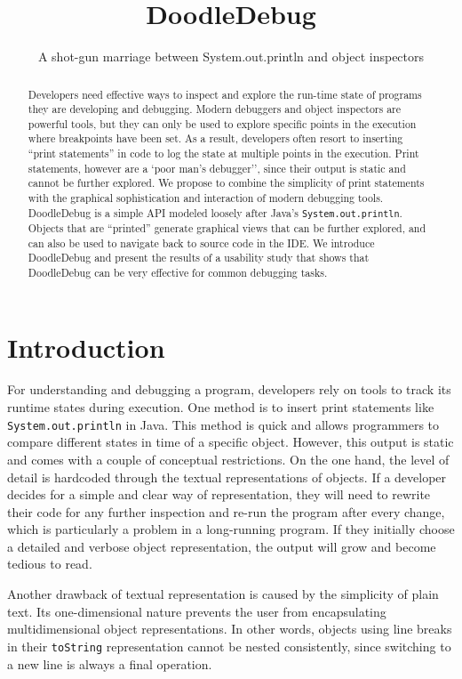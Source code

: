 \documentclass[english]{scrartcl}
\newcommand{\DD}{Dood\-le\-De\-bug\xspace}
\newcommand{\println}{\texttt{Sys\-tem.\-out.\-println}\xspace}
\begin{document}
\title{DoodleDebug}
\subtitle{A shot-gun marriage between System.out.println and object inspectors}
\maketitle

\begin{abstract}
Developers need effective ways to inspect and explore the run-time state of programs they are developing and debugging.  Modern debuggers and object inspectors are powerful tools, but they can only be used to explore specific points in the execution where breakpoints have been set. As a result, developers often resort to inserting ``print statements'' in code to log the state at multiple points in the execution. Print statements, however are a `poor man's debugger'', since their output is static and cannot be further explored.
We propose to combine the simplicity of print statements with the graphical sophistication and interaction of modern debugging tools.
\DD is a simple API modeled loosely after Java's \println. Objects that are ``printed'' generate graphical views that can be further explored, and can also be used to navigate back to source code in the IDE.
We introduce \DD and present the results of a usability study that shows that \DD can be very effective for common debugging tasks.
\end{abstract}

\section{Introduction}

For understanding and debugging a program, developers rely on tools to track its runtime states during execution.
One method is to insert print statements like \println in Java.
This method is quick and allows programmers to compare different states in time of a specific object.
However, this output is static and comes with a couple of conceptual restrictions. On the one hand, the level of detail is hardcoded through the textual representations of objects.
If a developer decides for a simple and clear way of representation, they will need to rewrite their code for any further inspection and re-run the program after every change, which is particularly a problem in a long-running program.
If they initially choose a detailed and verbose object representation, the output will grow and become tedious to read.

Another drawback of textual representation is caused by the simplicity of plain text.
Its one-dimensional nature prevents the user from encapsulating multidimensional object representations.
In other words, objects using line breaks in their \texttt{toString} representation cannot be nested consistently, since switching to a new line is always a final operation.
\end{document}
